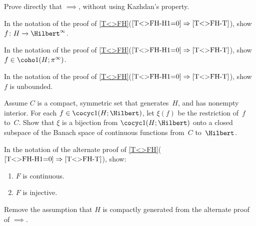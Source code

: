 \begin{exercises}
\item \label{FP->H1=0Ex}
Prove directly that $\implies$, without using Kazhdan's property.

\item \label{HinftyFunc}
In the notation of the proof of \ref{T<>FH}($\ref{T<>FH-H1=0}\Rightarrow\ref{T<>FH-T}$), show $f \colon H \to \Hilbert^\infty$.

\item \label{HinftyCocyc}
In the notation of the proof of  \ref{T<>FH}($\ref{T<>FH-H1=0}\Rightarrow\ref{T<>FH-T}$), show $f \in \coho1(H; \pi^\infty)$.

\item \label{HinftyUnbdd}
In the notation of the proof of \ref{T<>FH}($\ref{T<>FH-H1=0}\Rightarrow\ref{T<>FH-T}$), show $f$ is unbounded.

\item \label{CocycIsBanach}
Assume $C$ is a compact, symmetric set that generates~$H$, and has nonempty interior. For each $f \in \cocyc1(H;\Hilbert)$, let $\xi(f)$ be the restriction of~$f$ to~$C$. Show that $\xi$ is a bijection from $\cocyc1(H;\Hilbert)$ onto a closed subspace of the Banach space of continuous functions from~$C$ to~$\Hilbert$.

\item \label{AltFH->T-FEx}
In the notation of the alternate proof of \ref{T<>FH}($\ref{T<>FH-H1=0}\Rightarrow\ref{T<>FH-T}$), show:
	\begin{enumerate}
	\item  \label{AltFH->T-FEx-cont}
	$F$ is continuous.
	\item  \label{AltFH->T-FEx-inj}
	$F$ is injective.
	\end{enumerate}

\item \label{AltFH->T-NotCpctGen}
Remove the assumption that $H$ is compactly generated from the alternate proof of $\implies$.


\end{exercises}
